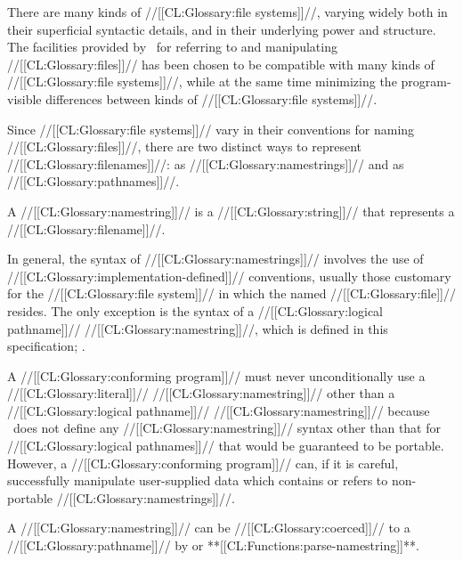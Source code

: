 

There are many kinds of //[[CL:Glossary:file systems]]//, varying widely both in their superficial syntactic details, 		and in their underlying power and structure. The facilities provided by \clisp\ for referring to and manipulating //[[CL:Glossary:files]]// has been chosen to be compatible with many kinds of //[[CL:Glossary:file systems]]//, while at the same time minimizing the program-visible differences  between kinds of //[[CL:Glossary:file systems]]//.

Since //[[CL:Glossary:file systems]]// vary in their conventions for naming //[[CL:Glossary:files]]//, there are two distinct ways to represent //[[CL:Glossary:filenames]]//: as //[[CL:Glossary:namestrings]]// and as //[[CL:Glossary:pathnames]]//.


 A //[[CL:Glossary:namestring]]// is a //[[CL:Glossary:string]]// that represents a //[[CL:Glossary:filename]]//.

In general, the syntax of //[[CL:Glossary:namestrings]]// involves the use of  //[[CL:Glossary:implementation-defined]]// conventions,  usually those customary for the //[[CL:Glossary:file system]]// in which the named //[[CL:Glossary:file]]// resides. The only exception is the syntax of a //[[CL:Glossary:logical pathname]]// //[[CL:Glossary:namestring]]//, which is defined in this specification; \seesection\LogPathNamestrings.

A //[[CL:Glossary:conforming program]]// must never unconditionally use a //[[CL:Glossary:literal]]// //[[CL:Glossary:namestring]]// other than a //[[CL:Glossary:logical pathname]]// //[[CL:Glossary:namestring]]// because \clisp\ does not define any //[[CL:Glossary:namestring]]// syntax  other than that for //[[CL:Glossary:logical pathnames]]// that would be guaranteed to be portable. However, a //[[CL:Glossary:conforming program]]// can, if it is careful,  successfully manipulate user-supplied data  which contains or refers to non-portable //[[CL:Glossary:namestrings]]//.

A //[[CL:Glossary:namestring]]// can be //[[CL:Glossary:coerced]]// to a //[[CL:Glossary:pathname]]// by  or **[[CL:Functions:parse-namestring]]**.

\endSubsection%

 

